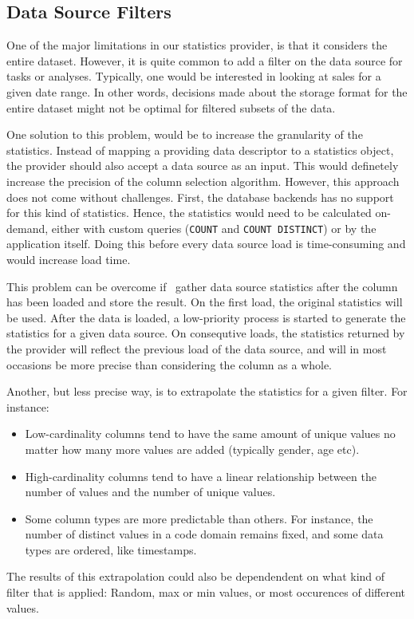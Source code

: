 \subsection{Data Source Filters}
\label{sub:Data Source Filters}
One of the major limitations in our statistics provider, is that it considers the entire dataset. However, it is quite common to add a filter on the data source for tasks or analyses. Typically, one would be interested in looking at sales for a given date range. In other words, decisions made about the storage format for the entire dataset might not be optimal for filtered subsets of the data.

One solution to this problem, would be to increase the granularity of the statistics. Instead of mapping a providing data descriptor to a statistics object, the provider should also accept a data source as an input. This would definetely increase the precision of the column selection algorithm. However, this approach does not come without challenges. First, the database backends has no support for this kind of statistics. Hence, the statistics would need to be calculated on-demand, either with custom queries (\texttt{COUNT} and \texttt{COUNT DISTINCT}) or by the application itself. Doing this before every data source load is time-consuming and would increase load time. 

This problem can be overcome if \gap~gather data source statistics after the column has been loaded and store the result. On the first load, the original statistics will be used. After the data is loaded, a low-priority process is started to generate the statistics for a given data source. On consequtive loads, the statistics returned by the provider will reflect the previous load of the data source, and will in most occasions be more precise than considering the column as a whole.

Another, but less precise way, is to extrapolate the statistics for a given filter. For instance:
\begin{itemize}
    \item Low-cardinality columns tend to have the same amount of unique values no matter how many more values are added (typically gender, age etc).
    \item High-cardinality columns tend to have a linear relationship between the number of values and the number of unique values.
    \item Some column types are more predictable than others. For instance, the number of distinct values in a code domain remains fixed, and some data types are ordered, like timestamps. 
\end{itemize}
The results of this extrapolation could also be dependendent on what kind of filter that is applied: Random, max or min values, or most occurences of different values.

